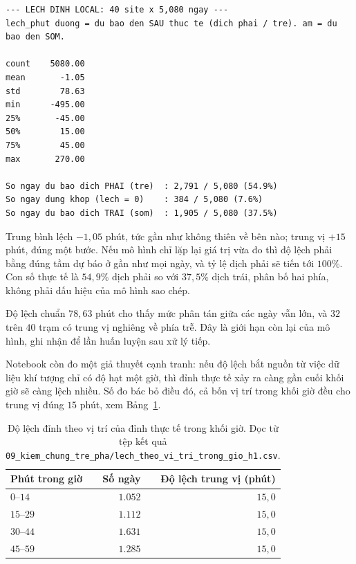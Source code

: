 \documentclass[12pt, a4paper]{report}
\begin{document}
\begingroup
\par{}\vspace{8pt}
\scriptsize\renewcommand{\baselinestretch}{1.0}\selectfont
\begin{verbatim}
--- LECH DINH LOCAL: 40 site x 5,080 ngay ---
lech_phut duong = du bao den SAU thuc te (dich phai / tre). am = du bao den SOM.

count    5080.00
mean       -1.05
std        78.63
min      -495.00
25%       -45.00
50%        15.00
75%        45.00
max       270.00

So ngay du bao dich PHAI (tre)  : 2,791 / 5,080 (54.9%)
So ngay dung khop (lech = 0)    : 384 / 5,080 (7.6%)
So ngay du bao dich TRAI (som)  : 1,905 / 5,080 (37.5%)
\end{verbatim}
\par\vspace{8pt}
\endgroup
Trung bình lệch $-1{,}05$ phút, tức gần như không thiên về bên nào; trung vị $+15$ phút, đúng
một bước. Nếu mô hình chỉ lặp lại giá trị vừa đo thì độ lệch phải bằng đúng tầm dự báo ở gần
như mọi ngày, và tỷ lệ dịch phải sẽ tiến tới $100\%$. Con số thực tế là $54{,}9\%$ dịch phải so
với $37{,}5\%$ dịch trái, phân bố hai phía, không phải dấu hiệu của mô hình sao chép.

Độ lệch chuẩn $78{,}63$ phút cho thấy mức phân tán giữa các ngày vẫn lớn, và $32$ trên $40$
trạm có trung vị nghiêng về phía trễ. Đây là giới hạn còn lại của mô hình, ghi nhận để lần huấn
luyện sau xử lý tiếp.

Notebook còn đo một giả thuyết cạnh tranh: nếu độ lệch bắt nguồn từ việc dữ liệu khí tượng chỉ
có độ hạt một giờ, thì đỉnh thực tế xảy ra càng gần cuối khối giờ sẽ càng lệch nhiều.
Số đo bác bỏ điều đó, cả bốn vị trí trong khối giờ đều cho trung vị đúng $15$ phút, xem Bảng~\ref{tab:lech_theo_vi_tri}.

\begin{table}[htbp]
\centering
\caption{Độ lệch đỉnh theo vị trí của đỉnh thực tế trong khối giờ. Đọc từ tệp kết quả
\texttt{09\_kiem\_chung\_tre\_pha/lech\_theo\_vi\_tri\_trong\_gio\_h1.csv}.}
\label{tab:lech_theo_vi_tri}
\small
\begin{tabular}{l r r}
\toprule
\textbf{Phút trong giờ} & \textbf{Số ngày} & \textbf{Độ lệch trung vị (phút)} \\
\midrule
$0$--$14$  & $1.052$ & $15{,}0$ \\
$15$--$29$ & $1.112$ & $15{,}0$ \\
$30$--$44$ & $1.631$ & $15{,}0$ \\
$45$--$59$ & $1.285$ & $15{,}0$ \\
\bottomrule
\end{tabular}
\end{table}
\end{document}
